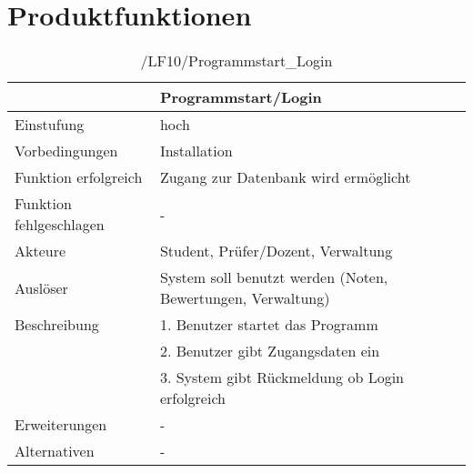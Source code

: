 \chapter{Produktfunktionen}

	\begin{table}[H]
		\centering
		\caption{/LF10/Programmstart\_Login}
		\begin{tabularx}{\textwidth}{l|X}
			\toprule
			                        & Programmstart/Login                                         \\ \midrule
			Einstufung              & hoch                                                        \\
			Vorbedingungen          & Installation                                                \\
			Funktion erfolgreich    & Zugang zur Datenbank wird ermöglicht                        \\
			Funktion fehlgeschlagen & -                                                           \\
			Akteure                 & Student, Prüfer/Dozent, Verwaltung                          \\
			Auslöser                & System soll benutzt werden (Noten, Bewertungen, Verwaltung) \\
			Beschreibung            & 1. Benutzer startet das Programm                            \\
			                        & 2. Benutzer gibt Zugangsdaten ein                           \\
			                        & 3. System gibt Rückmeldung ob Login erfolgreich             \\
			Erweiterungen           & -                                                           \\
			Alternativen            & -                                                           \\ \bottomrule
		\end{tabularx}%
		\label{tab:LF10ProLogin}%
	\end{table}%
	
